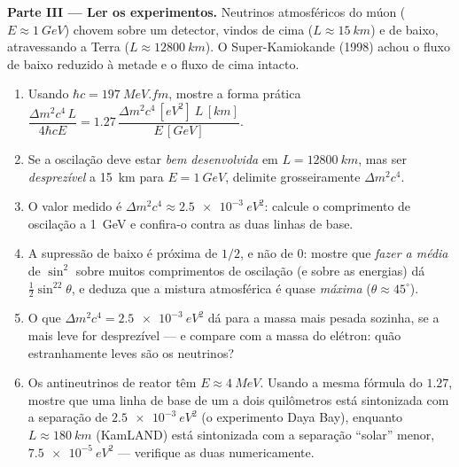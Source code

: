 \begin{problem}
\medskip\noindent\textbf{Parte III --- Ler os experimentos.}
Neutrinos atmosféricos do múon ($E \approx \qty{1}{GeV}$) chovem sobre
um detector, vindos de cima ($L \approx \qty{15}{km}$) e de baixo,
atravessando a Terra ($L \approx \qty{12800}{km}$). O
Super-Kamiokande (1998) achou o fluxo de baixo reduzido à metade e o
fluxo de cima intacto.
\begin{enumerate}[resume]
  \item Usando $\hbar c = \qty{197}{MeV.fm}$, mostre a forma prática
        $\dfrac{\Delta m^2c^4\,L}{4\hbar cE} = 1.27\,
        \dfrac{\Delta m^2c^4\,[\unit{eV^2}]\ L\,[\unit{km}]}
        {E\,[\unit{GeV}]}$.
  \item Se a oscilação deve estar \emph{bem desenvolvida} em $L =
        \qty{12800}{km}$, mas ser \emph{desprezível} a \qty{15}{km}
        para $E = \qty{1}{GeV}$, delimite grosseiramente
        $\Delta m^2c^4$.
  \item O valor medido é $\Delta m^2c^4 \approx
        \qty{2.5e-3}{eV^2}$: calcule o comprimento de oscilação a
        \qty{1}{GeV} e confira-o contra as duas linhas de base.
  \item A supressão de baixo é próxima de $1/2$, e não de $0$:
        mostre que \emph{fazer a média} de $\sin^2$ sobre muitos
        comprimentos de oscilação (e sobre as energias) dá
        $\tfrac12\sin^22\theta$, e deduza que a mistura atmosférica é
        quase \emph{máxima} ($\theta \approx 45^\circ$).
  \item O que $\Delta m^2c^4 = \qty{2.5e-3}{eV^2}$ dá para a massa
        mais pesada sozinha, se a mais leve for desprezível --- e
        compare com a massa do elétron: quão estranhamente leves são
        os neutrinos?
  \item Os antineutrinos de reator têm $E \approx \qty{4}{MeV}$.
        Usando a mesma fórmula do $1.27$, mostre que uma linha de base
        de um a dois quilômetros está sintonizada com a separação de
        $\qty{2.5e-3}{eV^2}$ (o experimento Daya Bay), enquanto
        $L \approx \qty{180}{km}$ (KamLAND) está sintonizada com a
        separação ``solar'' menor, $\qty{7.5e-5}{eV^2}$ --- verifique
        as duas numericamente.
\end{enumerate}


\end{problem}
